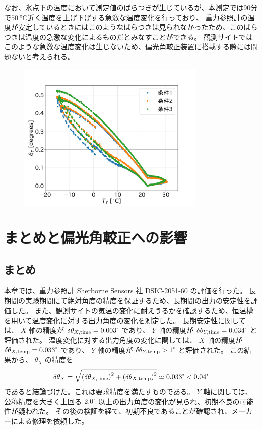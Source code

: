 \documentclass[../../main.tex]{subfiles}
\begin{document}
なお、氷点下の温度において測定値のばらつきが生じているが、本測定では90分で$\SI{50}{\degreeCelsius}$近く温度を上げ下げする急激な温度変化を行っており、
重力参照計の温度が安定しているときにはこのようなばらつきは見られなかったため、このばらつきは温度の急激な変化によるものだとみなすことができる。
観測サイトではこのような急激な温度変化は生じないため、偏光角較正装置に搭載する際には問題ないと考えられる。
\begin{figure}[H]
    \centering
    \includegraphics[width=0.8\textwidth]{tiltsensor/angleY_huryou_test.pdf}
    \label{fig:angleY_huryou_test}
\end{figure}

\section{まとめと偏光角較正への影響}
\subsection{まとめ}
本章では、重力参照計 Sherborne Sensors 社 DSIC-2051-60 の評価を行った。
長期間の実験期間にて絶対角度の精度を保証するため、長期間の出力の安定性を評価した。
また、観測サイトの気温の変化に耐えうるかを確認するため、恒温槽を用いて温度変化に対する出力角度の変化を測定した。
長期安定性に関しては、 $X$ 軸の精度が $\delta\theta_{X,\mathrm{time}} = 0.003\tcdegree$ であり、
$Y$ 軸の精度が $\delta\theta_{Y,\mathrm{time}} = 0.034\tcdegree$ と評価された。
温度変化に対する出力角度の変化に関しては、 $X$ 軸の精度が $\delta\theta_{X,\mathrm{temp}} = 0.033\tcdegree$ であり、
$Y$ 軸の精度が $\delta\theta_{Y,\mathrm{temp}} > 1\tcdegree$ と評価された。
この結果から、 $\theta_{X}$ の精度を 
\begin{equation}
    \delta\theta_X = \sqrt{\qty(\delta\theta_{X,\mathrm{time}})^2 + \qty(\delta\theta_{X,\mathrm{temp}})^2}\simeq 0.033\tcdegree < 0.04\tcdegree
\end{equation}
であると結論づけた。これは要求精度を満たすものである。
$Y$ 軸に関しては、公称精度を大きく上回る $2.0\tcdegree$ 以上の出力角度の変化が見られ、初期不良の可能性が疑われた。
その後の検証を経て、初期不良であることが確認され、メーカーによる修理を依頼した。
\end{document}
